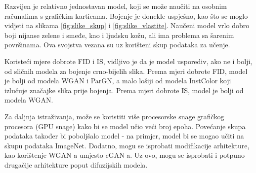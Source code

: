 
Razvijen je relativno jednostavan model, koji se može naučiti na osobnim računalima s grafičkim karticama. Bojenje je donekle uspješno, kao što se moglo vidjeti na slikama \ref{fig:slike_skup} i \ref{fig:slike_vlastite}. Naučeni model vrlo dobro boji nijanse zelene i smeđe, kao i ljudsku kožu, ali ima problema sa šarenim površinama. Ova svojstva vezana su uz korišteni skup podataka za učenje.

Koristeći mjere dobrote FID i IS, vidljivo je da je model usporediv, ako ne i bolji, od sličnih modela za bojenje crno-bijelih slika. Prema mjeri dobrote FID, model je bolji od modela WGAN\cite{pix2pixwgan} i ParGN\cite{kumar2022paracolorizer}, a malo lošiji od modela InstColor\cite{Su_2020_CVPR} koji izlučuje značajke slika prije bojenja. Prema mjeri dobrote IS, model je bolji od modela WGAN\cite{pix2pixwgan}.

Za daljnja istraživanja, može se koristiti više procesorske snage grafičkog procesora (GPU snage) kako bi se model učio veći broj epoha. Povećanje skupa podataka također bi poboljšalo model - na primjer, model bi se mogao učiti na skupu podataka ImageNet\cite{deng2009imagenet}. Dodatno, mogu se isprobati modifikacije arhitekture, kao korištenje WGAN-a umjesto cGAN-a. Uz ovo, mogu se isprobati i potpuno drugačije arhitekture poput difuzijskih modela\cite{sohl2015deep}.